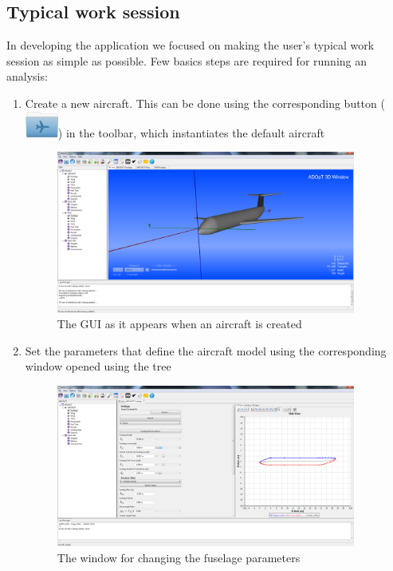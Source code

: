 \subsection{Typical work session}
In developing the application we focused on making the user's typical work session as simple as possible. Few basics steps are required for running an analysis:
%
\begin{enumerate}
	\setlength{\itemsep}{1ex}
	\item Create a new aircraft. This can be done using the corresponding button \big(\includegraphics[scale=0.6]{images/gui/icons/FolderAirplane_32x32.png}\big) in the toolbar, which instantiates the default aircraft
	\begin{figure}[h]
		\centering
		\includegraphics[width=0.93\textwidth,right]{images/gui/createAnotherAircraft}
		\caption{The GUI as it appears when an aircraft is created}
		\label{fig:guiDescription}
	\end{figure}
	
	\item Set the parameters that define the aircraft model using the corresponding window opened using the tree
	\begin{figure}[h]
		\centering
		\includegraphics[width=0.93\textwidth,right]{images/gui/changeFusParam}
		\caption{The window for changing the fuselage parameters}
	\end{figure}
	

\end{enumerate}
